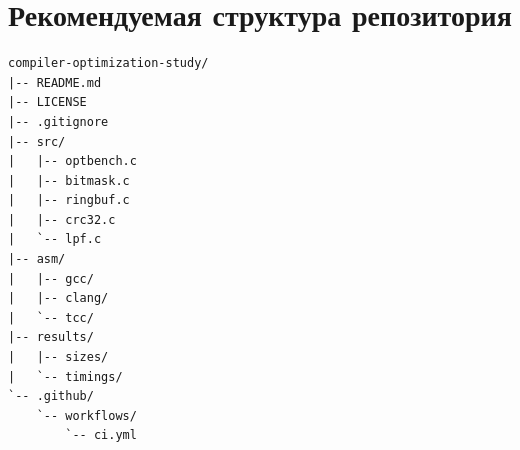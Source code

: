 \documentclass[12pt,a4paper]{article}
\begin{document}
\section{Рекомендуемая структура репозитория}

\begin{lstlisting}
compiler-optimization-study/
|-- README.md
|-- LICENSE
|-- .gitignore
|-- src/
|   |-- optbench.c
|   |-- bitmask.c
|   |-- ringbuf.c
|   |-- crc32.c
|   `-- lpf.c
|-- asm/
|   |-- gcc/
|   |-- clang/
|   `-- tcc/
|-- results/
|   |-- sizes/
|   `-- timings/
`-- .github/
    `-- workflows/
        `-- ci.yml
\end{lstlisting}
\end{document}
